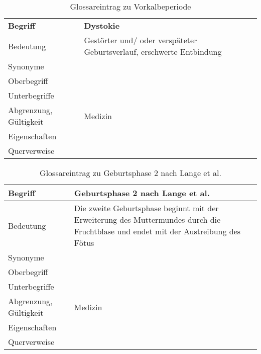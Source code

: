 \begin{table}[h]
	\centering	
	\begin{tabular}{ p{4.5cm} p{10.5cm} } 
		\toprule[1pt]
		\rowcolor{maroon!30}
		\textbf{Begriff} &  \textbf{Dystokie} \\		
	
		Bedeutung  & Gestörter und/ oder verspäteter Geburtsverlauf, erschwerte Entbindung\\		
		Synonyme  & \\				
		Oberbegriff  &  \\		
		Unterbegriffe   & \\		
		Abgrenzung, Gültigkeit  & Medizin\\				
		Eigenschaften  & \\			
		Querverweise  & \\	
		\bottomrule				
		
	\end{tabular}
	\label{tab: Glossareintrag zu Vorkalbeperiode}
	\caption{Glossareintrag zu Vorkalbeperiode}
\end{table}
\begin{table}[h]
	\centering	
	\begin{tabular}{ p{4.5cm} p{10.5cm} } 
		\toprule[1pt]
		\rowcolor{maroon!30}
		\textbf{Begriff} &  \textbf{Geburtsphase 2 nach Lange et al.}\\		
		\midrule
	
		Bedeutung  & Die zweite Geburtsphase beginnt mit der Erweiterung des Muttermundes durch die  Fruchtblase und endet mit der Austreibung des Fötus \cite{Lange2017}\\		
		Synonyme  & \\			
		Oberbegriff  &  \\		
		Unterbegriffe   & \\		
		Abgrenzung, Gültigkeit  & Medizin\\			
		Eigenschaften  & \\			
		Querverweise  &\\		
		\bottomrule			
		
	\end{tabular}
	\label{tab: Glossareintrag zu Geburtsphase 2 nach Lange et al.}
	\caption{Glossareintrag zu Geburtsphase 2 nach Lange et al.}
\end{table}


